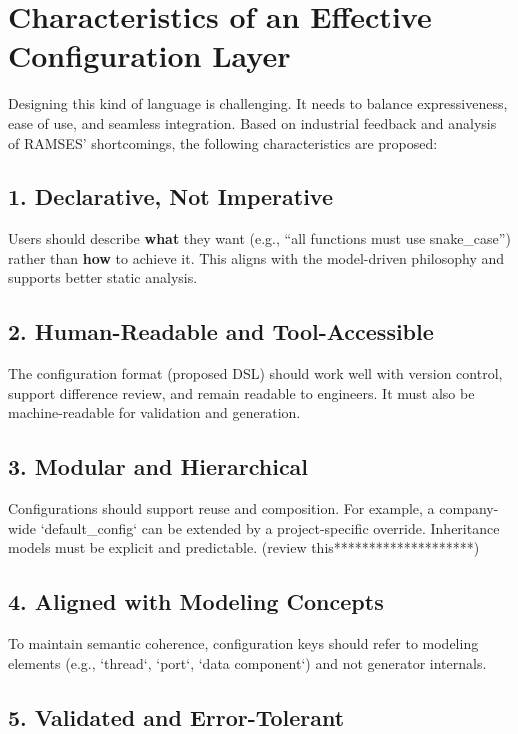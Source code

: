 \section{Characteristics of an Effective Configuration Layer}
\label{sec:config_language_characteristics}

Designing this kind of language is challenging. It needs to balance expressiveness, ease of use, and seamless integration. Based on industrial feedback and analysis of RAMSES’ shortcomings, the following characteristics are proposed:

\subsection*{1. Declarative, Not Imperative}

Users should describe \textbf{what} they want (e.g., “all functions must use snake\_case”) rather than \textbf{how} to achieve it. This aligns with the model-driven philosophy and supports better static analysis.

\subsection*{2. Human-Readable and Tool-Accessible}

The configuration format (proposed \gls{DSL}) should work well with version control, support difference review, and remain readable to engineers. It must also be machine-readable for validation and generation.

\subsection*{3. Modular and Hierarchical}

Configurations should support reuse and composition. For example, a company-wide `default\_config` can be extended by a project-specific override. Inheritance models must be explicit and predictable. (review this********************)

\subsection*{4. Aligned with Modeling Concepts}

To maintain semantic coherence, configuration keys should refer to modeling elements (e.g., `thread`, `port`, `data component`) and not generator internals.

\subsection*{5. Validated and Error-Tolerant}

